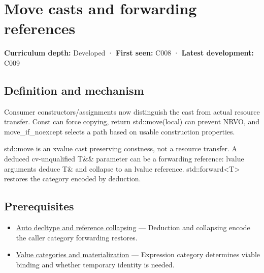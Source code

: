 \hypertarget{appendix-0104b704fb11}{}\label{referencestart:appendix-0104b704fb11}
\section{Move casts and forwarding references}\label{appendix-0104b704fb11-move-casts-and-forwarding-references}

\hypertarget{appendix-0104b704fb11-move-casts-and-forwarding-references}{}

\textbf{Curriculum depth:} Developed · \textbf{First seen:} C008 · \textbf{Latest development:} C009

\begin{allmightroledefinition}

\subsection{Definition and mechanism}\label{appendix-0104b704fb11-definition-and-mechanism}

\hypertarget{appendix-0104b704fb11-definition-and-mechanism}{}

Consumer constructors/assignments now distinguish the cast from actual resource transfer. Const can force copying, return std::move(local) can prevent NRVO, and move\_if\_noexcept selects a path based on usable construction properties.

\end{allmightroledefinition}

std::move is an xvalue cast preserving constness, not a resource transfer. A deduced cv-unqualified T\&\& parameter can be a forwarding reference: lvalue arguments deduce T\& and collapse to an lvalue reference. std::forward\textless T\textgreater{} restores the category encoded by deduction.

\subsection{Prerequisites}\label{appendix-0104b704fb11-prerequisites}

\hypertarget{appendix-0104b704fb11-prerequisites}{}

\begin{itemize}
\tightlist
\item
  \hyperref[appendix-5d4252a42886]{Auto decltype and reference collapsing} --- Deduction and collapsing encode the caller category forwarding restores.
\item
  \hyperref[appendix-1121b30eaeb0]{Value categories and materialization} --- Expression category determines viable binding and whether temporary identity is needed.
\end{itemize}

